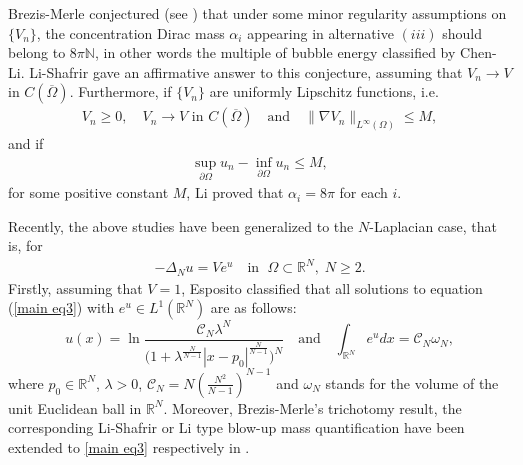 \documentclass[11pt]{amsart}
\numberwithin{equation}{section}
\newcommand{\N}{\mathbb{N}}
\newcommand{\R}{\mathbb{R}}
\begin{document}
Brezis-Merle conjectured (see \cite[Open Problem 4]{BM1991}) that under some minor regularity assumptions on ${\{V_n}\}$, the concentration Dirac mass $\alpha_i$ appearing in alternative $(iii)$ should belong to $8\pi\N$, in other words the multiple of bubble energy classified by Chen-Li. Li-Shafrir \cite{LS1994} gave an affirmative answer to this conjecture, assuming that $V_{n}\rightarrow V$ in $C(\overline{\Omega})$. Furthermore, if $\{V_{n}\}$ are uniformly Lipschitz functions, i.e.
\begin{align}\label{VC}
V_{n}\geq0, \quad V_{n}\rightarrow V \mbox{ in }C(\overline{\Omega}) \quad \mbox{and} \quad\|\nabla V_{n}\|_{L^{\infty}(\Omega)}\leq M,
\end{align}
and if
\begin{align}\label{+1}
\sup\limits_{\partial\Omega}u_{n}-\inf\limits_{\partial\Omega}u_{n}\leq M,
\end{align}
for some positive constant $M$, Li \cite{L1999} proved that $\alpha_i=8\pi$ for each $i$.

\medskip
Recently, the above studies have been generalized to the $N$-Laplacian case, that is, for
\begin{align}\label{main eq3}
-\Delta_{N}u=V e^{u} \quad\mbox{in } \; \Omega \subset \mathbb{R}^{N}, \; N \geq 2.
\end{align}
Firstly, assuming that $V=1$, Esposito \cite{E2018} classified that all solutions to equation (\ref{main eq3}) with $e^u \in L^1(\R^N)$ are as follows:
$$u(x)=\ln\frac{\mathcal{C}_{N}\lambda^{N}}{\big(1+\lambda^{\frac{N}{N-1}}|x-p_0|^{\frac{N}{N-1}}\big)^{N}} \quad\mbox{and}\quad \int_{\mathbb{R}^{N}}e^udx=\mathcal{C}_{N}\omega_{N},$$
where $p_0\in\mathbb{R}^{N}$, $\lambda > 0$, $\mathcal{C}_{N}=N\left(\frac{N^{2}}{N-1}\right)^{N-1}$ and $\omega_{N}$ stands for the volume of the unit Euclidean ball in $\mathbb{R}^{N}$. Moreover, Brezis-Merle's trichotomy result, the corresponding Li-Shafrir or Li type blow-up mass quantification have been extended to \eqref{main eq3} respectively in \cite{AP1997, EL2021, EM2015}.
\end{document}
